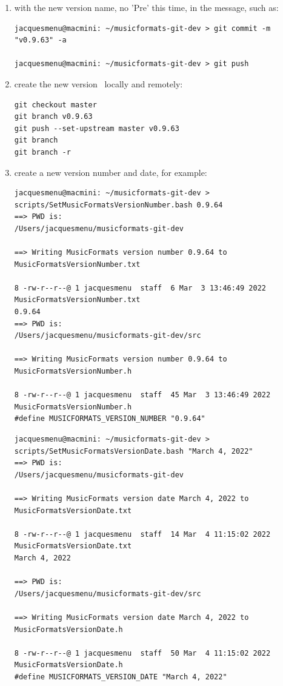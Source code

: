 \begin{enumerate}
\item {} with the new version name, no 'Pre' this time, in the  message, such as:
\begin{lstlisting}[language=Terminal]
jacquesmenu@macmini: ~/musicformats-git-dev > git commit -m "v0.9.63" -a

jacquesmenu@macmini: ~/musicformats-git-dev > git push
\end{lstlisting}


\item create the new version \branch\ locally and remotely:
\begin{lstlisting}[language=TerminalSmall]
git checkout master
git branch v0.9.63
git push --set-upstream master v0.9.63
git branch
git branch -r
\end{lstlisting}


\item create a new version number and date, for example:
\begin{lstlisting}[language=TerminalSmall]
jacquesmenu@macmini: ~/musicformats-git-dev > scripts/SetMusicFormatsVersionNumber.bash 0.9.64
==> PWD is:
/Users/jacquesmenu/musicformats-git-dev

==> Writing MusicFormats version number 0.9.64 to MusicFormatsVersionNumber.txt

8 -rw-r--r--@ 1 jacquesmenu  staff  6 Mar  3 13:46:49 2022 MusicFormatsVersionNumber.txt
0.9.64
==> PWD is:
/Users/jacquesmenu/musicformats-git-dev/src

==> Writing MusicFormats version number 0.9.64 to MusicFormatsVersionNumber.h

8 -rw-r--r--@ 1 jacquesmenu  staff  45 Mar  3 13:46:49 2022 MusicFormatsVersionNumber.h
#define MUSICFORMATS_VERSION_NUMBER "0.9.64"
\end{lstlisting}

\begin{lstlisting}[language=Terminal]
jacquesmenu@macmini: ~/musicformats-git-dev > scripts/SetMusicFormatsVersionDate.bash "March 4, 2022"
==> PWD is:
/Users/jacquesmenu/musicformats-git-dev

==> Writing MusicFormats version date March 4, 2022 to MusicFormatsVersionDate.txt

8 -rw-r--r--@ 1 jacquesmenu  staff  14 Mar  4 11:15:02 2022 MusicFormatsVersionDate.txt
March 4, 2022

==> PWD is:
/Users/jacquesmenu/musicformats-git-dev/src

==> Writing MusicFormats version date March 4, 2022 to MusicFormatsVersionDate.h

8 -rw-r--r--@ 1 jacquesmenu  staff  50 Mar  4 11:15:02 2022 MusicFormatsVersionDate.h
#define MUSICFORMATS_VERSION_DATE "March 4, 2022"
\end{lstlisting}

\end{enumerate}
